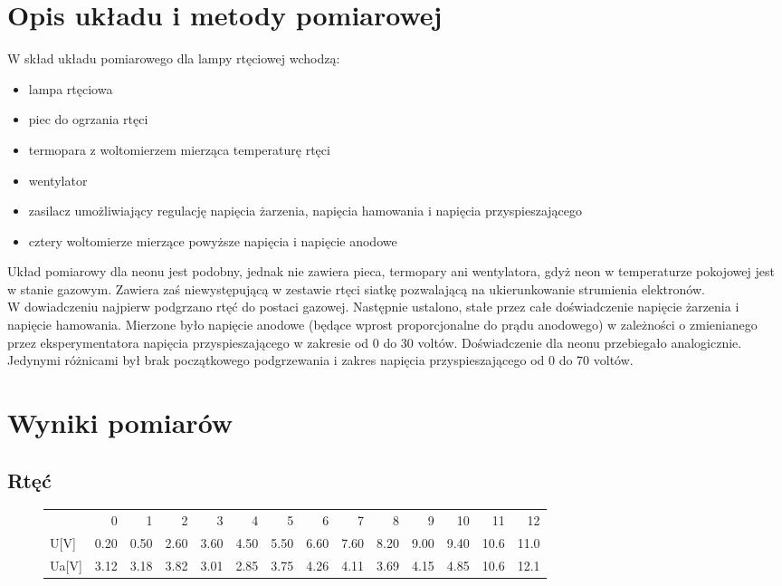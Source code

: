\documentclass[a4paper,10pt]{article}
\begin{document}
\section{Opis układu i metody pomiarowej}
W skład układu pomiarowego dla lampy rtęciowej wchodzą:
\begin{itemize}
  \item lampa rtęciowa
  \item piec do ogrzania rtęci
  \item termopara z woltomierzem mierząca temperaturę rtęci
  \item wentylator
  \item zasilacz umożliwiający regulację napięcia żarzenia, napięcia hamowania i napięcia przyspieszającego
  \item cztery woltomierze mierzące powyższe napięcia i napięcie anodowe
\end{itemize}
Układ pomiarowy dla neonu jest podobny, jednak nie zawiera pieca, termopary ani wentylatora, gdyż neon w temperaturze pokojowej jest w stanie gazowym. Zawiera zaś niewystępującą w
zestawie rtęci siatkę pozwalającą na ukierunkowanie strumienia elektronów.\\
W dowiadczeniu najpierw podgrzano rtęć do postaci gazowej. Następnie ustalono, stałe przez całe doświadczenie napięcie żarzenia i napięcie hamowania. Mierzone było napięcie
anodowe (będące wprost proporcjonalne do prądu anodowego) w zależności o zmienianego przez eksperymentatora napięcia przyspieszającego w zakresie od 0 do 30 voltów. Doświadczenie
dla neonu przebiegało analogicznie. Jedynymi różnicami był brak początkowego podgrzewania i zakres napięcia przyspieszającego od 0 do 70 voltów.

\section{Wyniki pomiarów}
\subsection{Rtęć}
\begin{figure}[H]
\begin{tabular}{lrrrrrrrrrrrrr}
{} &    0  &    1  &    2  &    3  &    4  &    5  &    6  &    7  &    8  &    9  &    10 &    11 &    12 \\
U[V]  &  0.20 &  0.50 &  2.60 &  3.60 &  4.50 &  5.50 &  6.60 &  7.60 &  8.20 &  9.00 &  9.40 &  10.6 &  11.0 \\
Ua[V] &  3.12 &  3.18 &  3.82 &  3.01 &  2.85 &  3.75 &  4.26 &  4.11 &  3.69 &  4.15 &  4.85 &  10.6 &  12.1 \\
\end{tabular}
\end{figure}
\end{document}
